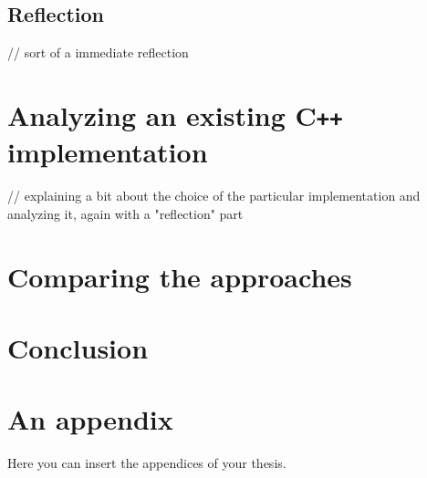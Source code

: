\documentclass[
  digital, %
  color,   %
  table,   %
  oneside, %
  lof,     %
  lot,     %
]{fithesis3}
\newcommand{\cpp}{C\nolinebreak\texttt{+}\nolinebreak\texttt{+}}
\begin{document}
\section{Reflection}
// sort of a immediate reflection



\chapter{Analyzing an existing \cpp{} implementation}
// explaining a bit about the choice of the particular implementation
and analyzing it, again with a "reflection" part

\chapter{Comparing the approaches}



\chapter*{Conclusion}




\printbibliography[heading=bibintoc] %


\makeatletter\thesis@blocks@clear\makeatother
{} %
\printindex


\appendix %
\chapter{An appendix}
Here you can insert the appendices of your thesis.
\end{document}
